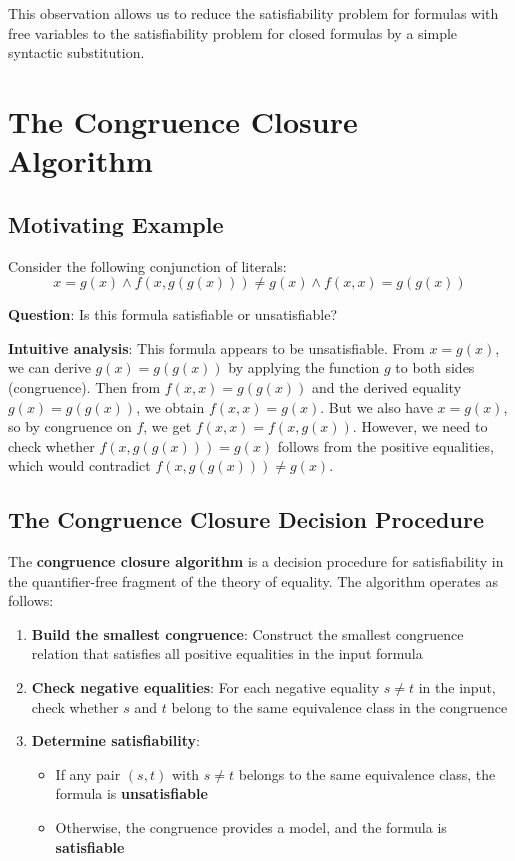 \documentclass[11pt,a4paper]{article}
\theoremstyle{definition}
\theoremstyle{plain}
\theoremstyle{remark}
\begin{document}
This observation allows us to reduce the satisfiability problem for formulas with free variables to the satisfiability problem for closed formulas by a simple syntactic substitution.

\section{The Congruence Closure Algorithm}

\subsection{Motivating Example}

Consider the following conjunction of literals:
\[
x = g(x) \wedge f(x, g(g(x))) \neq g(x) \wedge f(x, x) = g(g(x))
\]

\textbf{Question}: Is this formula satisfiable or unsatisfiable?

\textbf{Intuitive analysis}: This formula appears to be unsatisfiable. From $x = g(x)$, we can derive $g(x) = g(g(x))$ by applying the function $g$ to both sides (congruence). Then from $f(x, x) = g(g(x))$ and the derived equality $g(x) = g(g(x))$, we obtain $f(x, x) = g(x)$. But we also have $x = g(x)$, so by congruence on $f$, we get $f(x, x) = f(x, g(x))$. However, we need to check whether $f(x, g(g(x))) = g(x)$ follows from the positive equalities, which would contradict $f(x, g(g(x))) \neq g(x)$.

\subsection{The Congruence Closure Decision Procedure}

\begin{tcolorbox}[colback=orange!10!white,colframe=orange!75!black,title=\textbf{Congruence Closure Algorithm}]
The \textbf{congruence closure algorithm} is a decision procedure for satisfiability in the quantifier-free fragment of the theory of equality. The algorithm operates as follows:

\begin{enumerate}
    \item \textbf{Build the smallest congruence}: Construct the smallest congruence relation that satisfies all positive equalities in the input formula
    \item \textbf{Check negative equalities}: For each negative equality $s \neq t$ in the input, check whether $s$ and $t$ belong to the same equivalence class in the congruence
    \item \textbf{Determine satisfiability}:
    \begin{itemize}
        \item If any pair $(s, t)$ with $s \neq t$ belongs to the same equivalence class, the formula is \textbf{unsatisfiable}
        \item Otherwise, the congruence provides a model, and the formula is \textbf{satisfiable}
    \end{itemize}
\end{enumerate}
\end{tcolorbox}
\end{document}
